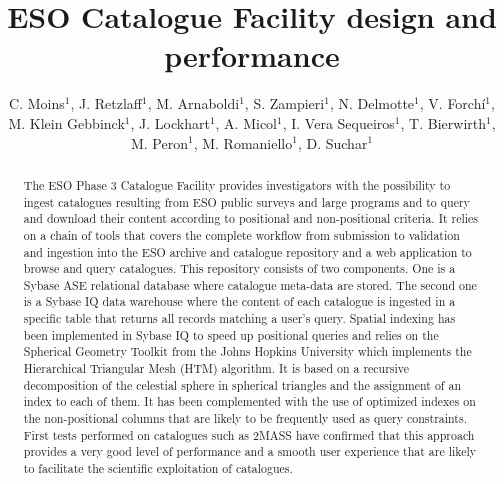 \documentclass[11pt,twoside]{article}
\begin{document}
\title{ESO Catalogue Facility design and performance}
\author{C. Moins$^1$, J. Retzlaff$^1$, M. Arnaboldi$^1$, S. Zampieri$^1$, N. Delmotte$^1$, V. Forch\'{i}$^1$,
 M. Klein Gebbinck$^1$, J. Lockhart$^1$, A. Micol$^1$, I. Vera Sequeiros$^1$, T. Bierwirth$^1$, M. Peron$^1$, M. Romaniello$^1$, D. Suchar$^1$
}

\begin{abstract}
The ESO Phase 3 Catalogue Facility provides investigators with the possibility to ingest catalogues resulting from ESO public surveys and large programs and to query and download their content according to positional and non-positional criteria. It relies on a chain of tools that covers the complete workflow from  submission to validation and ingestion into the ESO archive and catalogue repository and a web application to browse and query catalogues.
This repository consists of two components. One is a Sybase ASE relational database where catalogue meta-data are stored. The second one is a Sybase IQ data warehouse where the content of each catalogue is ingested in a specific table that returns all records matching a user's query. Spatial indexing has been implemented in Sybase IQ to speed up positional queries and relies on the Spherical Geometry Toolkit from the Johns Hopkins University which implements the Hierarchical Triangular Mesh (HTM) algorithm. It is based on a recursive decomposition of the celestial sphere in spherical triangles and the assignment of an index to each of them. It has been complemented with the use of optimized indexes on the non-positional columns that are likely to be frequently used as query constraints.
First tests performed on catalogues such as 2MASS have confirmed that this approach provides a very good level of performance and a smooth user experience that are likely to facilitate the scientific exploitation of catalogues.
\end{abstract}
\end{document}
